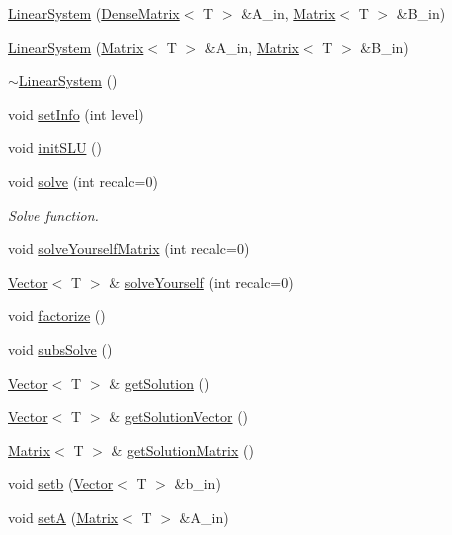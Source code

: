 \begin{DoxyCompactItemize}
\item 
\hyperlink{classlmx_1_1LinearSystem_ad20250c81acd520f270d5e3453745be3}{Linear\-System} (\hyperlink{classlmx_1_1DenseMatrix}{Dense\-Matrix}$<$ T $>$ \&A\-\_\-in, \hyperlink{classlmx_1_1Matrix}{Matrix}$<$ T $>$ \&B\-\_\-in)
\item 
\hyperlink{classlmx_1_1LinearSystem_a7d3fc5dc1293aa1d45a1779654a53b83}{Linear\-System} (\hyperlink{classlmx_1_1Matrix}{Matrix}$<$ T $>$ \&A\-\_\-in, \hyperlink{classlmx_1_1Matrix}{Matrix}$<$ T $>$ \&B\-\_\-in)
\item 
\hyperlink{classlmx_1_1LinearSystem_ac4c05a6a211d8946b18977e7e5abf5ba}{$\sim$\-Linear\-System} ()
\item 
void \hyperlink{classlmx_1_1LinearSystem_a2fde4449a4549d3c4b1b023ac5e72bc0}{set\-Info} (int level)
\item 
void \hyperlink{classlmx_1_1LinearSystem_ab5b14b289f951ce4dbd2772579dc7931}{init\-S\-L\-U} ()
\item 
void \hyperlink{classlmx_1_1LinearSystem_a4ae8b9934df6a9b57658956ff330ea53}{solve} (int recalc=0)
\begin{DoxyCompactList}\small\item\em Solve function. \end{DoxyCompactList}\item 
void \hyperlink{classlmx_1_1LinearSystem_a85c4b080918266b474fb39482bc14cc5}{solve\-Yourself\-Matrix} (int recalc=0)
\item 
\hyperlink{classlmx_1_1Vector}{Vector}$<$ T $>$ \& \hyperlink{classlmx_1_1LinearSystem_a38f94cd0e4929869c950cd2bc5a3b55e}{solve\-Yourself} (int recalc=0)
\item 
void \hyperlink{classlmx_1_1LinearSystem_ad9a2d56c7ea53a201d0820c58549ea7c}{factorize} ()
\item 
void \hyperlink{classlmx_1_1LinearSystem_a1595022f65961d5cfb5c7c9a9a85ee06}{subs\-Solve} ()
\item 
\hyperlink{classlmx_1_1Vector}{Vector}$<$ T $>$ \& \hyperlink{classlmx_1_1LinearSystem_a77193c1beae5ebefc8cbaa8137e69ddb}{get\-Solution} ()
\item 
\hyperlink{classlmx_1_1Vector}{Vector}$<$ T $>$ \& \hyperlink{classlmx_1_1LinearSystem_a8bd782242416197bf9497503a1bae3d5}{get\-Solution\-Vector} ()
\item 
\hyperlink{classlmx_1_1Matrix}{Matrix}$<$ T $>$ \& \hyperlink{classlmx_1_1LinearSystem_aca56732d810ce5c1688d1002efef8655}{get\-Solution\-Matrix} ()
\item 
void \hyperlink{classlmx_1_1LinearSystem_ac85310aca10575dc1cb27dbd1e38da6b}{setb} (\hyperlink{classlmx_1_1Vector}{Vector}$<$ T $>$ \&b\-\_\-in)
\item 
void \hyperlink{classlmx_1_1LinearSystem_a986906a2f375fc8ba39f43c927f39078}{set\-A} (\hyperlink{classlmx_1_1Matrix}{Matrix}$<$ T $>$ \&A\-\_\-in)
\end{DoxyCompactItemize}


